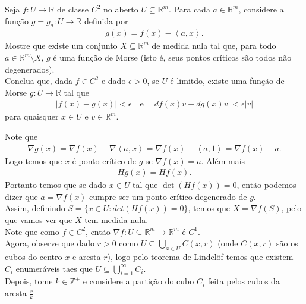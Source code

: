 \begin{homeworkProblem}[Seção 2-7]
  Seja $f:U\to\mathbb{R}$ de classe $C^{2}$ no aberto $U\subseteq \mathbb{R}^{m}$. Para cada $a\in\mathbb{R}^{m}$, considere a função $g=g_a:U\to\mathbb{R}$ definida por
  \begin{align*}
    g(x)=f(x)-\left\langle a,x \right\rangle.
  \end{align*}
  Mostre que existe um conjunto $X\subseteq\mathbb{R}^{m}$ de medida  nula tal que, para todo $a\in\mathbb{R}^{m}\setminus X$, $g$ é uma função de Morse (isto é, seus pontos críticos são todos não degenerados).\\
  Conclua que, dada $f\in C^{2}$ e dado $\epsilon>0$, se $U$ é limitdo, existe uma função de Morse $g:U\to\mathbb{R}$ tal que
  \begin{align*}
    |f(x)-g(x)|<\epsilon\quad\text{e}\quad|df(x)v-dg(x)v|<\epsilon|v|
  \end{align*}
  para quaisquer $x\in U$ e $v\in\mathbb{R}^{m}$. 
  \begin{solution}
    Note que
    \begin{align*}
      \nabla g(x)=\nabla f(x)-\nabla \left\langle a,x \right\rangle=\nabla f(x)-\left\langle a,1 \right\rangle=\nabla f(x)-a.
    \end{align*}
    Logo temos que $x$ é ponto crítico de $g$ se $\nabla f(x)=a$. Além mais
    \begin{align*}
      Hg(x)=Hf(x).
    \end{align*}
    Portanto temos que se dado $x\in U$ tal que $\det(Hf(x))=0$, então podemos dizer que $a=\nabla f(x)$ cumpre ser um ponto crítico degenerado de $g$.\\
    Assim, definindo $S=\{x\in U:det(Hf(x))=0\}$, temos que $X=\nabla f\left( S \right)$, pelo que vamos ver que $X$ tem medida nula.\\
    Note que como $f\in C^{2}$, então $\nabla f:U\subseteq \mathbb{R}^{m}\to\mathbb{R}^{m}$ é $C^{1}$.\\
    Agora, observe que dado $r>0$ como $U\subseteq \bigcup_{x\in U}C(x,r)$ (onde $C(x,r)$ são os cubos do centro $x$ e aresta $r$), logo pelo teorema de Lindelöf temos que existem $C_i$ enumeráveis taes que $U\subseteq \bigcup_{i=1}^{\infty}C_i$.\\
    Depois, tome $k\in\mathbb{Z}^{+}$ e considere a partição do cubo $C_i$ feita pelos cubos da aresta $\frac{r}{k}$
    \begin{center}
\end{center}
\end{solution}
\end{homeworkProblem}
